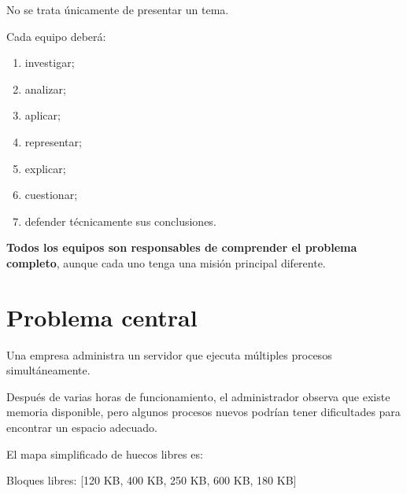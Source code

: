 \documentclass[
  spanish,
  letterpaper,
]{scrbook}
\newenvironment{Shaded}{\begin{snugshade}}{\end{snugshade}}
\newcommand{\NormalTok}[1]{\textcolor[rgb]{0.00,0.23,0.31}{#1}}
\providecommand{\tightlist}{%
  \setlength{\itemsep}{0pt}\setlength{\parskip}{0pt}}
\begin{document}
No se trata únicamente de presentar un tema.

Cada equipo deberá:

\begin{enumerate}
\def\labelenumi{\arabic{enumi}.}
\tightlist
\item
  investigar;
\item
  analizar;
\item
  aplicar;
\item
  representar;
\item
  explicar;
\item
  cuestionar;
\item
  defender técnicamente sus conclusiones.
\end{enumerate}

\begin{tcolorbox}[enhanced jigsaw, arc=.35mm, bottomrule=.15mm, bottomtitle=1mm, breakable, colback=white, colbacktitle=quarto-callout-important-color!10!white, colframe=quarto-callout-important-color-frame, coltitle=black, left=2mm, leftrule=.75mm, opacityback=0, opacitybacktitle=0.6, rightrule=.15mm, title=\textcolor{quarto-callout-important-color}{\faExclamation}\hspace{0.5em}{Regla fundamental}, titlerule=0mm, toprule=.15mm, toptitle=1mm]

\textbf{Todos los equipos son responsables de comprender el problema
completo}, aunque cada uno tenga una misión principal diferente.

\end{tcolorbox}


\chapter{Problema central}\label{problema-central}

Una empresa administra un servidor que ejecuta múltiples procesos
simultáneamente.

Después de varias horas de funcionamiento, el administrador observa que
existe memoria disponible, pero algunos procesos nuevos podrían tener
dificultades para encontrar un espacio adecuado.

El mapa simplificado de huecos libres es:

\begin{Shaded}
\begin{Highlighting}[]
\NormalTok{Bloques libres:}
\NormalTok{[120 KB, 400 KB, 250 KB, 600 KB, 180 KB]}
\end{Highlighting}
\end{Shaded}
\end{document}
